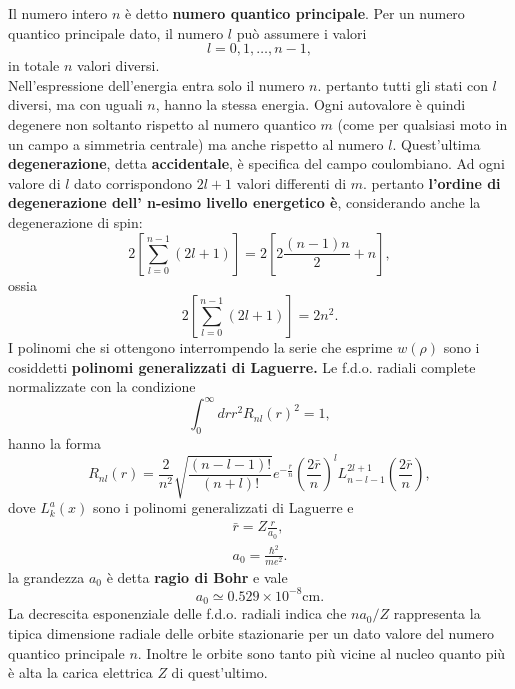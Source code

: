 Il numero intero $n$ è detto \textbf{numero quantico principale}. Per un numero quantico principale dato, il numero $l$ può assumere i valori
\begin{equation}
l=0,1,\dots,n-1,
\end{equation}
in totale $n$ valori diversi.\\
Nell'espressione dell'energia entra solo il numero $n$. pertanto tutti gli stati con $l$ diversi, ma con uguali $n$, hanno la stessa energia. Ogni autovalore è quindi degenere non soltanto rispetto al numero quantico $m$ (come per qualsiasi moto in un campo a simmetria centrale) ma anche rispetto al numero $l$. Quest'ultima \textbf{degenerazione}, detta \textbf{accidentale}, è specifica del campo coulombiano. Ad ogni valore di $l$ dato corrispondono $2l+1$ valori differenti di $m$. pertanto \textbf{l'ordine di degenerazione dell' n-esimo livello energetico è}, considerando anche la degenerazione di spin:
\begin{equation}
2 \left[ \sum _{l=0} ^{n-1} \left(2l+1 \right)\right]=2 \left[ 2\frac{\left( n-1 \right) n}{2}+n\right],
\end{equation}
ossia
\begin{equation}
2 \left[ \sum _{l=0} ^{n-1} \left(2l+1 \right)\right]= 2n^2.
\end{equation}
I polinomi che si ottengono interrompendo la serie che esprime $w(\rho)$ sono i cosiddetti \textbf{polinomi generalizzati di Laguerre.} Le f.d.o. radiali complete normalizzate con la condizione
\begin{equation}
\int _0 ^{\infty} dr r^2 {R_{nl} (r)}^2=1,
\end{equation}
hanno la forma
\begin{equation}
R_{nl}(r) =\frac{2}{n^2}\sqrt{\frac{\left(n-l-1\right) !}{\left(n+l\right) !}} e^{-\frac{\bar{r}}{n}}\left(\frac{2\bar{r}}{n}\right) ^l L_{n-l-1} ^{2l+1} \left(\frac{2\bar{r}}{n}\right) ,
\end{equation}
dove $L_k ^a (x)$ sono i polinomi generalizzati di Laguerre e
\begin{eqnarray}
\bar{r}= Z\frac{r}{a_0},\\
a_0= \frac{\hbar ^2}{me^2}.
\end{eqnarray}
la grandezza $a_0$ è detta \textbf{ragio di Bohr} e vale
\begin{equation}
a_0 \simeq 0.529 \times 10^{-8} \textrm{cm}.
\end{equation}
La decrescita esponenziale delle f.d.o. radiali indica che $n a_0/Z$ rappresenta la tipica dimensione radiale delle orbite stazionarie per un dato valore del numero quantico principale $n$. Inoltre le orbite sono tanto più vicine al nucleo quanto più è alta la carica elettrica $Z$ di quest'ultimo.\\
